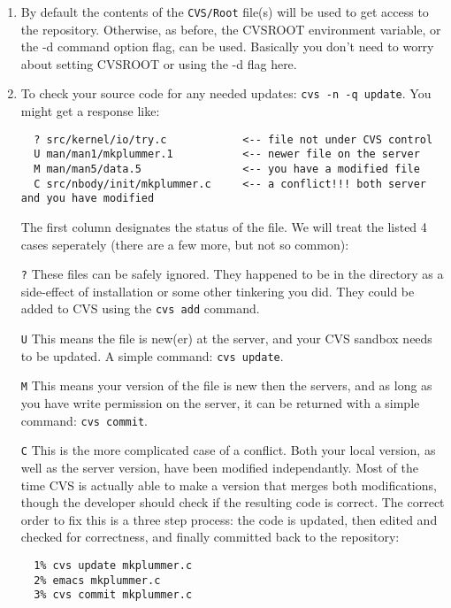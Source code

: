 \begin{enumerate}

\item By default the contents of the {\tt CVS/Root} file(s) will be used to
get access to the repository. Otherwise, as before, the CVSROOT environment
variable, or the -d command option flag, can be used. Basically you
don't need to worry about setting CVSROOT or using the -d flag here.

\item To check your source code for any needed updates: {\tt cvs -n -q update}.
You might get a response like:
\footnotesize\begin{verbatim}
  ? src/kernel/io/try.c            <-- file not under CVS control
  U man/man1/mkplummer.1           <-- newer file on the server
  M man/man5/data.5                <-- you have a modified file
  C src/nbody/init/mkplummer.c     <-- a conflict!!! both server and you have modified
\end{verbatim}\normalsize
The first column designates the status of the file. 
We will treat the listed 4 cases seperately (there are a few more, but not
so common):

\item[{\tt ?}] 
These files can be safely ignored. They happened to be in the directory
as a side-effect of installation or some other tinkering you did. They could
be added to CVS using the {\tt cvs add} command.

\item[{\tt U}] 
This means the file is new(er) at the server, and your
CVS sandbox needs to be updated. A simple command: {\tt cvs update}.

\item[{\tt M}] This means your version of the file is new then the servers, 
and as long as you have write permission on the server, it can be returned
with a simple command: {\tt cvs commit}.



\item[{\tt C}] This is the more complicated case of a conflict. Both your local
version, as well as the server version, have been modified independantly.
Most of the time CVS is actually able to make a version that merges both
modifications, though the developer should check if the resulting code
is correct. The correct order to fix this is a three step process: the
code is updated, then edited and checked for correctness, and finally
committed back to the repository:

\footnotesize\begin{verbatim}
  1% cvs update mkplummer.c
  2% emacs mkplummer.c
  3% cvs commit mkplummer.c
\end{verbatim}\normalsize




\end{enumerate}

